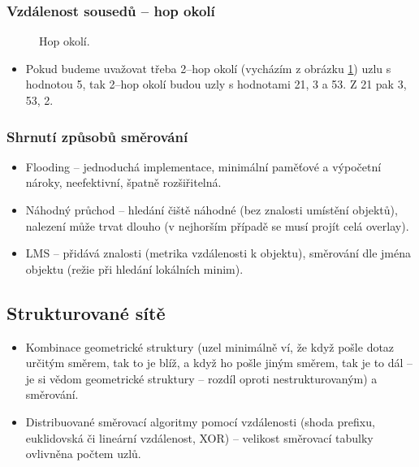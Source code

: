 \documentclass[11pt,a4paper]{article}
\begin{document}
\subsubsection*{Vzdálenost sousedů -- hop okolí}
\begin{figure}[ht!]
\begin{center}
\caption{Hop okolí.}
\label{hop}
\end{center}
\end{figure}
\begin{itemize}
\item Pokud budeme uvažovat třeba 2--hop okolí (vycházím z obrázku \ref{hop}) uzlu s hodnotou 5, tak 2--hop okolí budou uzly s hodnotami 21, 3 a 53. Z 21 pak 3, 53, 2.
\end{itemize}

\subsubsection{Shrnutí způsobů směrování}
\begin{itemize}
\item Flooding -- jednoduchá implementace, minimální paměťové a výpočetní nároky, neefektivní, špatně rozšiřitelná.
\item Náhodný průchod -- hledání čiště náhodné (bez znalosti umístění objektů), nalezení může trvat dlouho (v nejhorším případě se musí projít celá overlay).
\item LMS -- přidává znalosti (metrika vzdálenosti k objektu), směrování dle jména objektu (režie při hledání lokálních minim).
\end{itemize}

\subsection{Strukturované sítě}
\begin{itemize}
\item Kombinace geometrické struktury (uzel minimálně ví, že když pošle dotaz určitým směrem, tak to je blíž, a když ho pošle jiným směrem, tak je to dál -- je si vědom geometrické struktury -- rozdíl oproti nestrukturovaným) a směrování.
\item Distribuované směrovací algoritmy pomocí vzdálenosti (shoda prefixu, euklidovská či lineární vzdálenost, XOR) -- velikost směrovací tabulky ovlivněna počtem uzlů.
\end{itemize}
\end{document}
